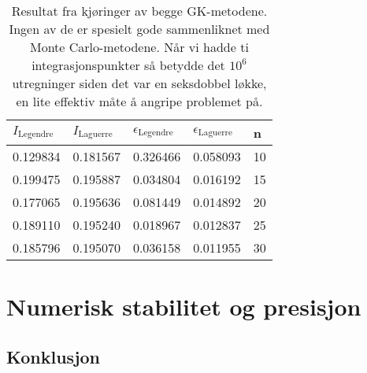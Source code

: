 \documentclass[norsk, 10pt]{article}
\begin{document}
\begin{table}[H]
  \centering
  \begin{tabular}{ l l l l l}
    \toprule
    $I_{\text{Legendre}}$ & $I_{\text{Laguerre}}$ & $\epsilon_{\text{Legendre}}$ & $\epsilon_{\text{Laguerre}}$ & n \\
    \midrule
	0.129834 & 0.181567 & 0.326466 & 0.058093 & 10 \\
	0.199475 & 0.195887 & 0.034804 & 0.016192 & 15 \\
	0.177065 & 0.195636 & 0.081449 & 0.014892 & 20 \\
	0.189110 & 0.195240 & 0.018967 & 0.012837 & 25 \\
	0.185796 & 0.195070 & 0.036158 & 0.011955 & 30 \\
	\bottomrule
  \end{tabular}
  \caption{Resultat fra kjøringer av begge GK-metodene. Ingen av de er spesielt gode sammenliknet med Monte Carlo-metodene. Når vi hadde ti integrasjonspunkter så betydde det $10^6$ utregninger siden det var en seksdobbel løkke, en lite effektiv måte å angripe problemet på.}
  \label{tab:gauleg}
\end{table}

\section*{Numerisk stabilitet og presisjon}

\subsection*{Konklusjon}
\end{document}
